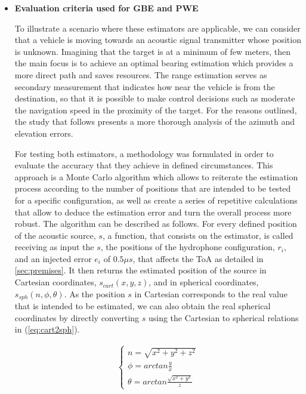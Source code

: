 \begin{itemize}
	\item \textbf{Evaluation criteria used for GBE and PWE}
	
	To illustrate a scenario where these estimators are applicable, we can consider that a vehicle is moving towards an acoustic signal transmitter whose position is unknown. Imagining that the target is at a minimum of few meters, then the main focus is to achieve an optimal bearing estimation which provides a more direct path and saves resources. The range estimation serves as secondary measurement that indicates how near the vehicle is from the destination, so that it is possible to make control decisions such as moderate the navigation speed in the proximity of the target. For the reasons outlined, the study that follows presents a more thorough analysis of the azimuth and elevation errors. 
	
	For testing both estimators, a methodology was formulated in order to evaluate the accuracy that they achieve in defined circumstances. This approach is a Monte Carlo algorithm which allows to reiterate the estimation process according to the number of positions that are intended to be tested for a specific configuration, as well as create a series of repetitive calculations that allow to deduce the estimation error and turn the overall process more robust.
	The algorithm can be described as follows. For every defined position of the acoustic source, $s$, a function, that consists on the estimator, is called receiving as input the $s$, the positions of the hydrophone configuration, $r_i$, and an injected error $e_i$ of $0.5 \mu s$, that affects the ToA as detailed in \ref{sec:premises}. It then returns the estimated position of the source in Cartesian coordinates, $s_{cart}(x,y,z)$, and in spherical coordinates, $s_{sph}(n, \phi, \theta)$. As the position $s$ in Cartesian corresponds to the real value that is intended to be estimated, we can also obtain the real spherical coordinates by directly converting $s$ using the Cartesian to spherical relations in (\ref{eq:cart2sph}).
	
	\begin{eqnarray}
		\begin{cases} 
			n =  \sqrt{x^2 + y^2 + z^2}\\ 
			\phi  = arctan \frac{y}{x}\\ 
			\theta =  arctan \frac{\sqrt{x^2+y^2}}{z}
		\end{cases}
		\label{eq:cart2sph}
	\end{eqnarray}
	

\end{itemize}
